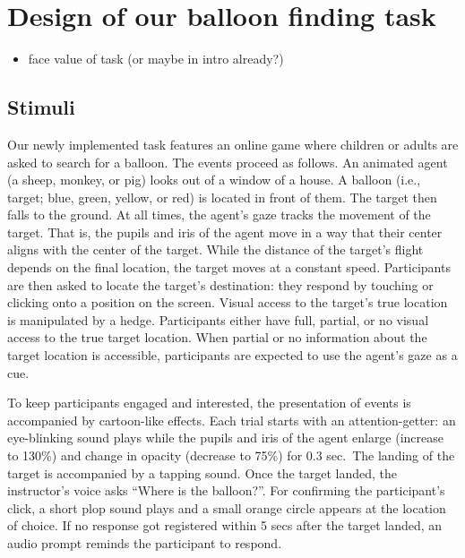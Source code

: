\documentclass[
  man,floatsintext]{apa6}
\providecommand{\tightlist}{%
  \setlength{\itemsep}{0pt}\setlength{\parskip}{0pt}}
\begin{document}
\hypertarget{design-of-our-balloon-finding-task}{%
\section{Design of our balloon finding task}\label{design-of-our-balloon-finding-task}}

\begin{itemize}
\tightlist
\item
  face value of task (or maybe in intro already?)
\end{itemize}

\hypertarget{stimuli}{%
\subsection{Stimuli}\label{stimuli}}

Our newly implemented task features an online game where children or adults are asked to search for a balloon. The events proceed as follows. An animated agent (a sheep, monkey, or pig) looks out of a window of a house. A balloon (i.e., target; blue, green, yellow, or red) is located in front of them. The target then falls to the ground. At all times, the agent's gaze tracks the movement of the target. That is, the pupils and iris of the agent move in a way that their center aligns with the center of the target. While the distance of the target's flight depends on the final location, the target moves at a constant speed. Participants are then asked to locate the target's destination: they respond by touching or clicking onto a position on the screen. Visual access to the target's true location is manipulated by a hedge. Participants either have full, partial, or no visual access to the true target location. When partial or no information about the target location is accessible, participants are expected to use the agent's gaze as a cue.

To keep participants engaged and interested, the presentation of events is accompanied by cartoon-like effects. Each trial starts with an attention-getter: an eye-blinking sound plays while the pupils and iris of the agent enlarge (increase to 130\%) and change in opacity (decrease to 75\%) for 0.3 sec.~The landing of the target is accompanied by a tapping sound. Once the target landed, the instructor's voice asks ``Where is the balloon?''. For confirming the participant's click, a short plop sound plays and a small orange circle appears at the location of choice. If no response got registered within 5 secs after the target landed, an audio prompt reminds the participant to respond.
\end{document}
